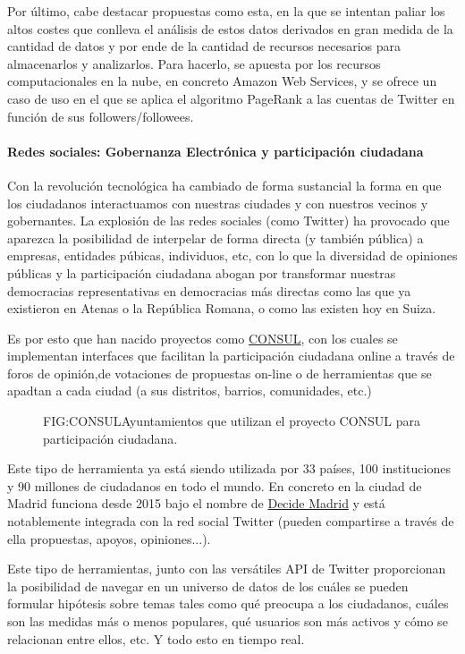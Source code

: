 Por último, cabe destacar propuestas como esta, en la que se intentan paliar los altos costes que conlleva el análisis de estos datos derivados en gran medida de la cantidad de datos y por ende de la cantidad de recursos necesarios para almacenarlos y analizarlos. Para hacerlo, se apuesta por los recursos computacionales en la nube, en concreto Amazon Web Services, y se ofrece un caso de uso en el que se aplica el algoritmo PageRank a las cuentas de Twitter en función de sus followers/followees.

\paragraph{Redes sociales: Gobernanza Electrónica y participación ciudadana}
Con la revolución tecnológica ha cambiado de forma sustancial la forma en que los ciudadanos interactuamos con nuestras ciudades y con nuestros vecinos y gobernantes. La explosión de las redes sociales (como Twitter) ha provocado que aparezca la posibilidad de interpelar de forma directa (y también pública) a empresas, entidades púbicas, individuos, etc, con lo que la diversidad de opiniones públicas y la participación ciudadana abogan por transformar nuestras democracias representativas en democracias más directas como las que ya existieron en Atenas o la República Romana, o como las existen hoy en Suiza.

Es por esto que han nacido proyectos como \href{http://consulproject.org/en/}{CONSUL}, con los cuales se implementan interfaces que facilitan la participación ciudadana online a través de foros de opinión,de votaciones de propuestas on-line o de herramientas que se apadtan a cada ciudad (a sus distritos, barrios, comunidades, etc.) 

\begin{figure}[CONSUL en España y el mundo]{FIG:CONSUL}{Ayuntamientos que utilizan el proyecto CONSUL para participación ciudadana.}
	 \quad
\end{figure}

Este tipo de herramienta ya está siendo utilizada por 33 países, 100 instituciones y 90 millones de ciudadanos en todo el mundo. En concreto en la ciudad de Madrid funciona desde 2015 bajo el nombre de \href{https://decide.madrid.es/}{Decide Madrid} y está notablemente integrada con la red social Twitter (pueden compartirse  a través de ella propuestas, apoyos, opiniones...).

Este tipo de herramientas, junto con las versátiles API de Twitter proporcionan la posibilidad de navegar en un universo de datos de los cuáles se pueden formular hipótesis sobre temas tales como qué preocupa a los ciudadanos, cuáles son las medidas más o menos populares, qué usuarios son más activos y cómo se relacionan entre ellos, etc. Y todo esto en tiempo real.

